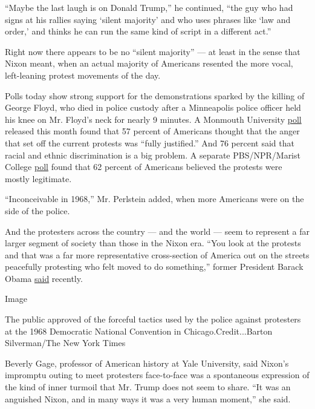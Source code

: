 ``Maybe the last laugh is on Donald Trump,'' he continued, ``the guy who
had signs at his rallies saying `silent majority' and who uses phrases
like `law and order,' and thinks he can run the same kind of script in a
different act.''

Right now there appears to be no ``silent majority'' --- at least in the
sense that Nixon meant, when an actual majority of Americans resented
the more vocal, left-leaning protest movements of the day.

Polls today show strong support for the demonstrations sparked by the
killing of George Floyd, who died in police custody after a Minneapolis
police officer held his knee on Mr. Floyd's neck for nearly 9 minutes. A
Monmouth University
\href{https://www.monmouth.edu/polling-institute/reports/monmouthpoll_US_060220/}{poll}
released this month found that 57 percent of Americans thought that the
anger that set off the current protests was ``fully justified.'' And 76
percent said that racial and ethnic discrimination is a big problem. A
separate PBS/NPR/Marist College
\href{http://maristpoll.marist.edu/wp-content/uploads/2020/06/NPR_PBS-NewsHour_Marist-Poll_USA-NOS-and-Tables_2006041039.pdf}{poll}
found that 62 percent of Americans believed the protests were mostly
legitimate.

``Inconceivable in 1968,'' Mr. Perlstein added, when more Americans were
on the side of the police.

And the protesters across the country --- and the world --- seem to
represent a far larger segment of society than those in the Nixon era.
``You look at the protests and that was a far more representative
cross-section of America out on the streets peacefully protesting who
felt moved to do something,'' former President Barack Obama
\href{https://www.cnbc.com/2020/06/03/barack-obama-says-protests-across-the-country-arent-like-the-1968-riots-which-some-think-helped-elect-nixon.html}{said}
recently.

Image

The public approved of the forceful tactics used by the police against
protesters at the 1968 Democratic National Convention in
Chicago.Credit...Barton Silverman/The New York Times

Beverly Gage, professor of American history at Yale University, said
Nixon's impromptu outing to meet protesters face-to-face was a
spontaneous expression of the kind of inner turmoil that Mr. Trump does
not seem to share. ``It was an anguished Nixon, and in many ways it was
a very human moment,'' she said.

